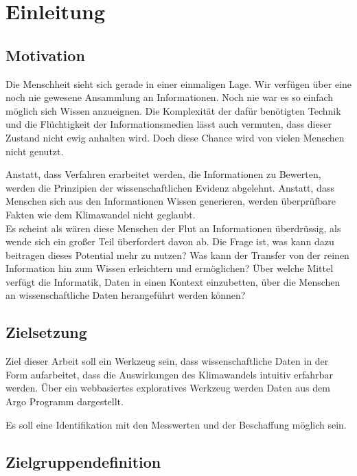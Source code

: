 \section{Einleitung}

    \subsection{Motivation}
    
    Die Menschheit sieht sich gerade in einer einmaligen Lage. Wir verfügen über eine noch nie gewesene Ansammlung an Informationen. Noch nie war es so einfach möglich sich Wissen anzueignen. Die Komplexität der dafür benötigten Technik und die Flüchtigkeit der Informationsmedien lässt auch vermuten, dass dieser Zustand nicht ewig anhalten wird.
    Doch diese Chance wird von vielen Menschen nicht genutzt. 
    
    Anstatt, dass  Verfahren erarbeitet werden, die Informationen zu Bewerten, werden die Prinzipien der wissenschaftlichen Evidenz abgelehnt. Anstatt, dass Menschen sich aus den Informationen Wissen generieren, werden überprüfbare Fakten wie dem Klimawandel nicht geglaubt.\\
    
    Es scheint als wären diese Menschen der Flut an Informationen überdrüssig, als wende sich ein großer Teil überfordert davon ab.
    Die Frage ist, was kann dazu beitragen dieses Potential mehr zu nutzen? Was kann der Transfer von der reinen Information hin zum Wissen erleichtern und ermöglichen? Über welche Mittel verfügt die Informatik, Daten in einen Kontext einzubetten, über die Menschen an wissenschaftliche Daten herangeführt werden können?
    
    \subsection{Zielsetzung}
    
    Ziel dieser Arbeit soll ein Werkzeug sein, dass wissenschaftliche Daten in der Form aufarbeitet, dass die Auswirkungen des Klimawandels intuitiv erfahrbar werden.
    Über ein webbasiertes exploratives Werkzeug werden Daten aus dem Argo Programm dargestellt. 
    
    Es soll eine Identifikation mit den Messwerten und der Beschaffung möglich sein.
    
    
    \subsection{Zielgruppendefinition}
    
